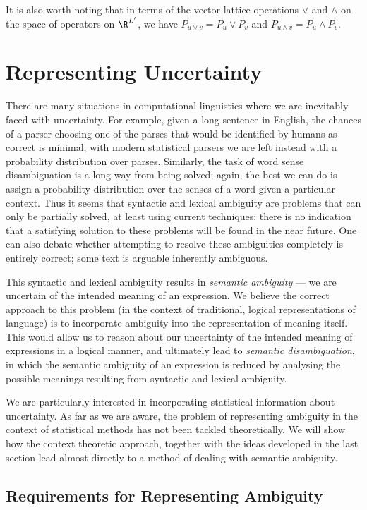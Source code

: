 It is also worth noting that in terms of the vector lattice operations $\lor$ and $\land$ on the space of operators on $\R^{L'}$, we have $P_{u\lor v} = P_u \lor P_v$ and $P_{u\land v} = P_u \land P_v$.


\section{Representing Uncertainty}

There are many situations in computational linguistics where we are inevitably faced with uncertainty. For example, given a long sentence in English, the chances of a parser choosing one of the parses that would be identified by humans as correct is minimal; with modern statistical parsers we are left instead with a probability distribution over parses. Similarly, the task of word sense disambiguation is a long way from being solved; again, the best we can do is assign a probability distribution over the senses of a word given a particular context. Thus it seems that syntactic and lexical ambiguity are problems that can only be partially solved, at least using current techniques: there is no indication that a satisfying solution to these problems will be found in the near future. One can also debate whether attempting to resolve these ambiguities completely is entirely correct; some text is arguable inherently ambiguous.

This syntactic and lexical ambiguity results in \emph{semantic ambiguity} --- we are uncertain of the intended meaning of an expression. We believe the correct approach to this problem (in the context of traditional, logical representations of language) is to incorporate ambiguity into the representation of meaning itself. This would allow us to reason about our uncertainty of the intended meaning of expressions in a logical manner, and ultimately lead to \emph{semantic disambiguation}, in which the semantic ambiguity of an expression is reduced by analysing the possible meanings resulting from syntactic and lexical ambiguity.

We are particularly interested in incorporating statistical information about uncertainty. As far as we are aware, the problem of representing ambiguity in the context of statistical methods has not been tackled theoretically. We will show how the context theoretic approach, together with the ideas developed in the last section lead almost directly to a method of dealing with semantic ambiguity.

\subsection{Requirements for Representing Ambiguity}

